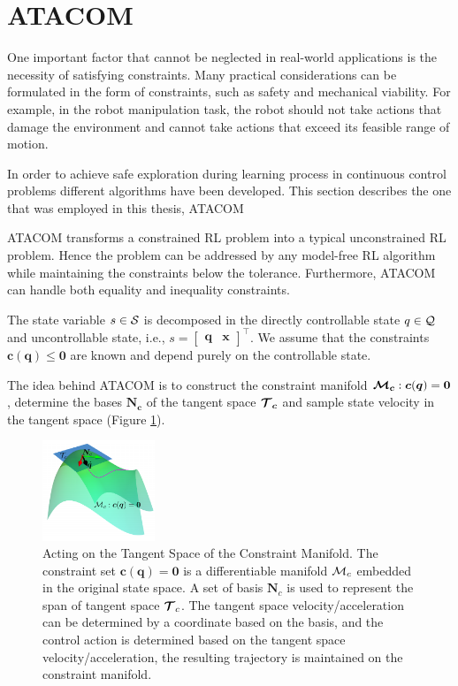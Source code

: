 \section{ATACOM}
\label{sec:atacom}
One important factor that cannot be neglected in real-world applications is the necessity of satisfying constraints.
Many practical considerations can be formulated in the form of constraints, such as safety and mechanical viability. For example,
in the robot manipulation task, the robot should not take actions that damage the environment and cannot take actions that exceed
its feasible range of motion.

In order to achieve safe exploration during learning process in continuous control problems different algorithms have been developed.
This section describes the one that was employed in this thesis, ATACOM \cite{Atacom}
 
ATACOM transforms a constrained RL problem into a typical unconstrained RL problem. Hence the problem can be addressed by any
model-free RL algorithm while maintaining the constraints below the tolerance. Furthermore, ATACOM can handle both equality and inequality
constraints.

The state variable $s \in \mathcal{S}$ is decomposed in the directly controllable state $q \in \mathcal{Q}$ and uncontrollable state, i.e., $s = \left[\begin{smallmatrix} \bm{q} & \bm{x}\end{smallmatrix}\right]^\intercal$.
We assume that the constraints $\bm{c}(\bm{q}) \le \bm{0}$ are known and depend purely on the controllable state. 

The idea behind ATACOM is to construct the constraint manifold $\bm{\mathcal{M}_c} : \bm{c}(\bm{q}) = \bm{0}$, determine the bases $\bm{N_c}$ of the tangent space $\bm{\mathcal{T}_c}$
and sample state velocity in the tangent space (Figure \ref{fig:constraint_manifold}).

\begin{figure}[H]
    \centering
    \includegraphics[width=0.3\textwidth]{Images/constraint_manifold.png}
    \caption[ATACOM]{
        Acting on the Tangent Space of the Constraint Manifold. The constraint set $\bm{c}(\bm{q}) = \bm{0}$ is a differentiable manifold
        $\mathcal{M}_c$ embedded in the original state space. A set of basis $\bm{N}_c$ is used to represent the span of tangent space $\bm{\mathcal{T}}_c$.
        The tangent space velocity/acceleration can be determined by a coordinate based on the basis, and the control action is determined based on the tangent
        space velocity/acceleration, the resulting trajectory is maintained on the constraint manifold.
        }
    \label{fig:constraint_manifold}
\end{figure}

